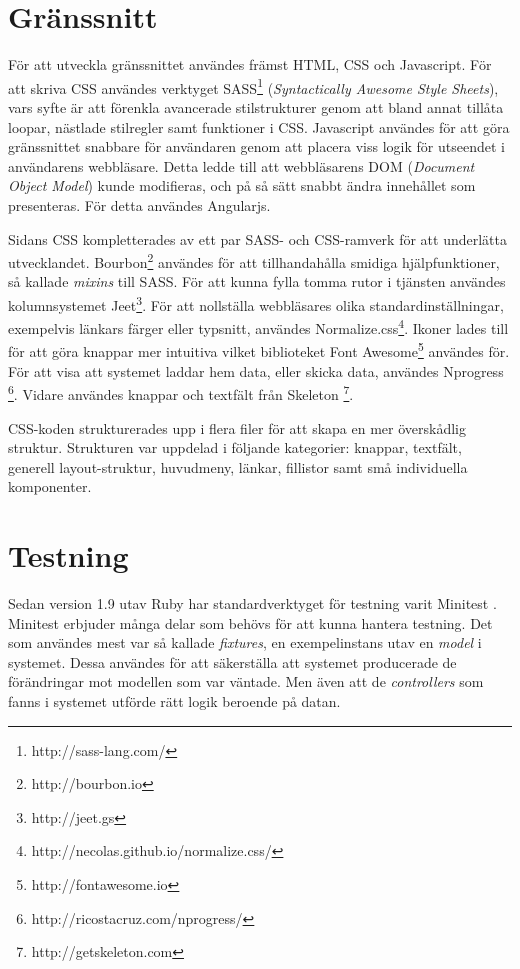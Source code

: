 \section{Gränssnitt}
För att utveckla gränssnittet användes främst HTML, CSS och Javascript. För att skriva CSS användes verktyget SASS\footnote{http://sass-lang.com/} (\textit{Syntactically Awesome Style Sheets}), vars syfte är att förenkla avancerade stilstrukturer genom att bland annat tillåta loopar, nästlade stilregler samt funktioner i CSS. Javascript användes för att göra gränssnittet snabbare för användaren genom att placera viss logik för utseendet i användarens webbläsare. Detta ledde till att webbläsarens DOM (\textit{Document Object Model}) kunde modifieras, och på så sätt snabbt ändra innehållet som presenteras. För detta användes Angularjs.

Sidans CSS kompletterades av ett par SASS- och CSS-ramverk för att underlätta utvecklandet. Bourbon\footnote{http://bourbon.io} användes för att tillhandahålla smidiga hjälpfunktioner, så kallade \textit{mixins} till SASS. För att kunna fylla tomma rutor i tjänsten användes kolumnsystemet Jeet\footnote{http://jeet.gs}. För att nollställa webbläsares olika standardinställningar, exempelvis länkars färger eller typsnitt, användes Normalize.css\footnote{http://necolas.github.io/normalize.css/}. Ikoner lades till för att göra knappar mer intuitiva vilket biblioteket Font Awesome\footnote{http://fontawesome.io}  användes för. För att visa att systemet laddar hem data, eller skicka data, användes Nprogress \footnote{http://ricostacruz.com/nprogress/}. Vidare användes knappar och textfält från Skeleton  \footnote{http://getskeleton.com}.

CSS-koden strukturerades upp i flera filer för att skapa en mer överskådlig struktur. Strukturen var uppdelad i följande kategorier: knappar, textfält, generell layout-struktur, huvudmeny, länkar, fillistor samt små individuella komponenter.

\section{Testning}\label{sec:4test}
Sedan version 1.9 utav Ruby har standardverktyget för testning varit Minitest \cite{rubychangelog}. Minitest erbjuder många delar som behövs för att kunna hantera testning. Det som användes mest var så kallade \textit{fixtures}, en exempelinstans utav en \textit{model} i systemet. Dessa användes för att säkerställa att systemet producerade de förändringar mot modellen som var väntade. Men även att de \textit{controllers} som fanns i systemet utförde rätt logik beroende på datan.

